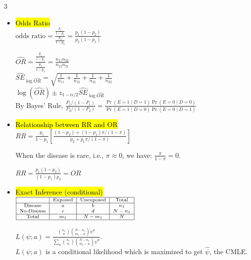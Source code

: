 \documentclass[a4paper,10pt]{article}
\begin{document}
\begin{multicols}{3}
\begin{itemize}
    $
    \hat{SE}_{\log \hat{RR}} = \left( \frac{1 - \hat{p}_1}{n_1 \hat{p}_1} + \frac{1 - \hat{p}_2}{n_2 \hat{p}_2} \right)^{1/2}
    $
    
    $CI: \log(\hat{RR}) \pm z_{1 - \alpha/2} \hat{SE}_{\log \hat{RR}}$

    \item \hl{Odds Ratio}\\
    $\text{odds ratio}
     = \frac{\frac{p_1}{1 - p_1}}{\frac{p_2}{1 - p_2}} = \frac{p_1(1 - p_2)}{p_2(1 - p_1)}
    $
    
    $
    \hat{OR} = \frac{\frac{\hat{p}_1}{1 - \hat{p}_1}}{\frac{\hat{p}_2}{1 - \hat{p}_2}} = \frac{n_{11} n_{22}}{n_{12} n_{21}}
    $\\
    $
    \hat{SE}_{\log \hat{OR}} = \sqrt{\frac{1}{n_{11}} + \frac{1}{n_{12}} + \frac{1}{n_{21}} + \frac{1}{n_{22}}}
    $\\
    $\log(\hat{OR}) \pm z_{1 - \alpha / 2} \hat{SE}_{\log \hat{OR}}$\\
    By Bayes' Rule, $\frac{P_1 / (1 - P_1)}{P_2 / (1 - P_2)} = 
    \frac{\Pr(E = 1 \mid D = 1) \Pr(E = 0 \mid D = 0)}{\Pr(E = 1 \mid D = 0) \Pr(E = 0 \mid D = 1)}
    $
    \item \hl{Relationship between RR and OR}\\
    $RR = \frac{p_1}{1 - p_1} 
    \left[
    \frac{(1 - p_2) + (1 - p_1)\pi / (1 - \pi)}{p_2 + p_1\pi / (1 - \pi)}
    \right]$
    
    When the disease is rare, i.e., \(\pi \approx 0\), we have:
    $\frac{\pi}{1 - \pi} = 0.$
    
    $RR = \frac{p_1 (1 - p_2)}{(1 - p_1) p_2} = OR$

    \item \hl{Exact Inference (conditional)}\\
    $
    \scriptsize
    \begin{array}{|c|c|c|c|}
    \hline
     & \text{Exposed} & \text{Unexposed} & \text{Total} \\
    \hline
    \text{Disease} & a & b & n_1 \\
    \text{No-Disease} & c & d & N - n_1 \\
    \hline
    \text{Total} & m_1 & N - m_1 & N \\
    \hline
    \end{array}
    $
    

    $
    L(\psi; a) =
    \frac{\binom{n_1}{a} \binom{N - n_1}{m_1 - a} \psi^a}
    {\sum_u \binom{n_1}{u} \binom{N - n_1}{m_1 - u} \psi^u}.
    $\\
    $L(\psi; a)$ is a conditional likelihood which is maximized to get $ \hat{\psi}$, the CMLE.
    

\end{itemize}
\end{multicols}
\end{document}
